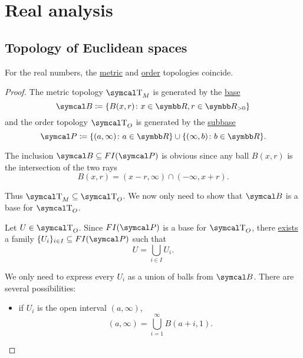 \section{Real analysis}\label{sec:real_analysis}
\subsection{Topology of Euclidean spaces}\label{subsec:real_vector_space_geometry}

\begin{theorem}\label{thm:real_metric_and_order_topologies_coincide}
  For the real numbers, the \hyperref[def:metric_topology]{metric} and \hyperref[def:order_topology]{order} topologies coincide.
\end{theorem}
\begin{proof}
  The metric topology \( \CT_M \) is generated by the \hyperref[def:topological_base]{base}
  \begin{equation*}
    \Cal{B} \coloneqq \{ B(x, r) \colon x \in \BR, r \in \BR_{>0} \}
  \end{equation*}
  and the order topology \( \CT_O \) is generated by the \hyperref[def:topological_subbase]{subbase}
  \begin{equation*}
    \Cal{P} \coloneqq \{ (a, \infty) \colon a \in \BR \} \cup \{ (\infty, b) \colon b \in \BR \}.
  \end{equation*}

  The inclusion \( \Cal{B} \subseteq FI(\Cal{P}) \) is obvious since any ball \( B(x, r) \) is the intersection of the two rays
  \begin{equation*}
    B(x, r) = (x - r, \infty) \cap (-\infty, x + r).
  \end{equation*}

  Thus \( \CT_M \subseteq \CT_O \). We now only need to show that \( \Cal{B} \) is a base for \( \CT_O \).

  Let \( U \in \CT_O \). Since \( FI(\Cal{P}) \) is a base for \( \CT_O \), there \hyperref[def:topological_base/union]{exists} a family \( \{ U_i \}_{i \in I} \subseteq FI(\Cal{P}) \) such that
  \begin{equation*}
    U = \bigcup_{i \in I} U_i.
  \end{equation*}

  We only need to express every \( U_i \) as a union of balls from \( \Cal{B} \). There are several possibilities:
  \begin{itemize}
    \item if \( U_i \) is the open interval \( (a, \infty) \),
    \begin{equation*}
      (a, \infty) = \bigcup_{i=1}^\infty B(a + i, 1).
    \end{equation*}


\end{itemize}
\end{proof}
